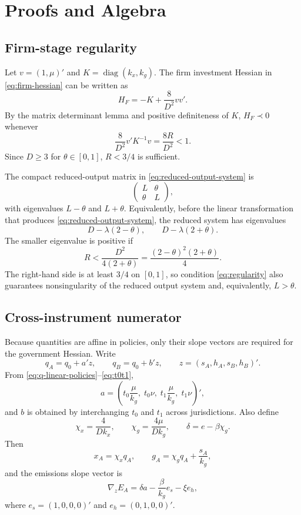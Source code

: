 \appendix
\section{Proofs and Algebra}
\label{app:proofs}

\subsection{Firm-stage regularity}

Let $v=(1,\mu)'$ and $K=\operatorname{diag}(k_x,k_g)$. The firm investment Hessian in \eqref{eq:firm-hessian} can be written as
\[
H_F=-K+\frac{8}{D^2}vv'.
\]
By the matrix determinant lemma and positive definiteness of $K$, $H_F\prec0$ whenever
\[
\frac{8}{D^2}v'K^{-1}v
=\frac{8R}{D^2}<1.
\]
Since $D\geq3$ for $\theta\in[0,1]$, $R<3/4$ is sufficient.

The compact reduced-output matrix in \eqref{eq:reduced-output-system} is
\[
\begin{pmatrix}L&\theta\\ \theta&L\end{pmatrix},
\]
with eigenvalues $L-\theta$ and $L+\theta$. Equivalently, before the linear transformation that produces \eqref{eq:reduced-output-system}, the reduced system has eigenvalues
\[
D-\lambda(2-\theta),
\qquad
D-\lambda(2+\theta).
\]
The smaller eigenvalue is positive if
\[
R<\frac{D^2}{4(2+\theta)}
=\frac{(2-\theta)^2(2+\theta)}4.
\]
The right-hand side is at least $3/4$ on $[0,1]$, so condition \eqref{eq:regularity} also guarantees nonsingularity of the reduced output system and, equivalently, $L>\theta$.

\subsection{Cross-instrument numerator}

Because quantities are affine in policies, only their slope vectors are required for the government Hessian. Write
\[
q_A=q_0+a'z,\qquad q_B=q_0+b'z,
\qquad z=(s_A,h_A,s_B,h_B)'.
\]
From \eqref{eq:q-linear-policies}--\eqref{eq:t0t1},
\[
a=\left(t_0\frac{\mu}{k_g},\;t_0\nu,\;t_1\frac{\mu}{k_g},\;t_1\nu\right)',
\]
and $b$ is obtained by interchanging $t_0$ and $t_1$ across jurisdictions. Also define
\[
\chi_x=\frac{4}{Dk_x},
\qquad
\chi_g=\frac{4\mu}{Dk_g},
\qquad
\delta=e-\beta\chi_g.
\]
Then
\[
x_A=\chi_x q_A,
\qquad
g_A=\chi_g q_A+\frac{s_A}{k_g},
\]
and the emissions slope vector is
\[
\nabla_z E_A=\delta a-\frac{\beta}{k_g}e_s-\xi e_h,
\]
where $e_s=(1,0,0,0)'$ and $e_h=(0,1,0,0)'$.

